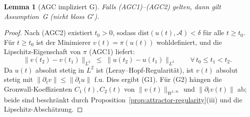 \documentclass[12pt,a4paper]{article}
\theoremstyle{definition}
\theoremstyle{plain}
\newtheorem{lemma}[definition]{Lemma}
\theoremstyle{remark}
\begin{document}
\begin{lemma}[AGC impliziert G]\label{lem:AGC-implies-G}
Falls \textup{(AGC1)--(AGC2)} gelten, dann gilt Assumption~G
\textup{(}nicht bloss G$'$\textup{)}.
\end{lemma}

\begin{proof}
Nach (AGC2) existiert $t_0 > 0$, sodass
$\mathrm{dist}(u(t), \mathcal{A}) < \delta$ für alle $t \ge t_0$.
Für $t \ge t_0$ ist der Minimierer $v(t) = \pi(u(t))$ wohldefiniert, und
die Lipschitz-Eigenschaft von $\pi$ (AGC1) liefert:
\[
  \|v(t_2) - v(t_1)\|_{L^2}
  \;\le\;
  \|u(t_2) - u(t_1)\|_{L^2}
  \qquad \forall\, t_0 \le t_1 < t_2.
\]
Da $u(t)$ absolut stetig in $L^2$ ist (Leray--Hopf-Regularität),
ist $v(t)$ absolut stetig mit $\|\partial_t v\| \le \|\partial_t u\|$
f.u. Dies ergibt (G1). Für (G2) hängen die Gronwall-Koeffizienten $C_1(t),
C_2(t)$ von $\|v(t)\|_{W^{1,\infty}}$ und $\|\partial_t v(t)\|$ ab;
beide sind beschränkt durch
Proposition~\ref{prop:attractor-regularity}(iii) und die Lipschitz-Abschätzung.
\end{proof}
\end{document}
